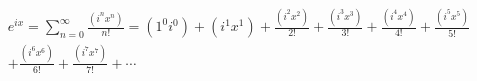 \documentclass[preview]{standalone}
\begin{document}
\begin{align*}
e^{ix} = \sum_{n=0}^{\infty} \frac{(i^nx^n)}{n!} = (1^0i^0) + (i^1x^1) + \frac{(i^2x^2)}{2!} + \frac{(i^3x^3)}{3!} + \frac{(i^4x^4)}{4!} + \frac{(i^5x^5)}{5!} \\ + \frac{(i^6x^6)}{6!} + \frac{(i^7x^7)}{7!} + \cdots
\end{align*}
\end{document}
